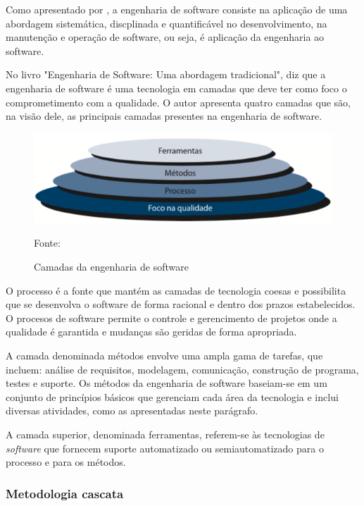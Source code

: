 Como apresentado por \cite{tripp1994ieee}, a engenharia de software consiste na aplicação de uma abordagem sistemática, discplinada
e quantificável no desenvolvimento, na manutenção e operação de software, ou seja, é aplicação da engenharia ao
software.

No livro "Engenharia de Software: Uma abordagem tradicional",  diz que a engenharia de software é
uma tecnologia em camadas que deve ter como foco o comprometimento com a qualidade. O autor apresenta quatro camadas que
são, na visão dele, as principais camadas presentes na engenharia de software. 

\pagebreak

\begin{figure}[h]
	\centering
	\includegraphics[keepaspectratio=true,scale=0.45]{figuras/camada.png}
	\caption{Camadas da engenharia de software}
	Fonte: \cite{pressman}
	\label{figura123}
\end{figure}

O processo é a fonte que mantém as camadas de tecnologia coesas e possibilita que se desenvolva o software de 
forma racional e dentro dos prazos estabelecidos. O procesos de software permite o controle e gerencimento de
projetos onde  a qualidade é garantida e mudanças são geridas de forma apropriada.

A camada denominada métodos envolve uma ampla gama de tarefas, que incluem: análise de requisitos, modelagem,
comunicação, construção de programa, testes e suporte. Os métodos da engenharia de software baseiam-se em um 
conjunto de princípios básicos que gerenciam cada área da tecnologia e inclui diversas atividades, como as
apresentadas neste parágrafo.

A camada superior, denominada ferramentas, referem-se às tecnologias de \textit{software} que fornecem suporte
automatizado ou semiautomatizado para o processo e para os métodos.

\subsubsection{Metodologia cascata}


